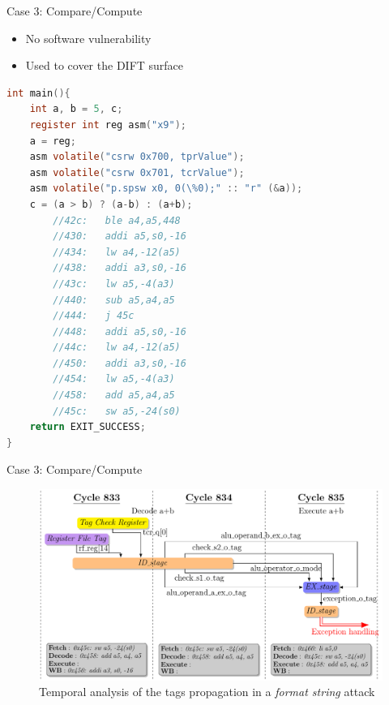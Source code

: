 \begin{frame}{Case 3: Compare/Compute}
    \begin{itemize}
        \justifying
        \item No software vulnerability
        \item Used to cover the DIFT surface
    \end{itemize}

    \centering
    \begin{minipage}[c]{\textwidth}
        \begin{lstlisting}[language=C,label=code:compareCompute]
int main(){
    int a, b = 5, c;
    register int reg asm("x9");
    a = reg;
    asm volatile("csrw 0x700, tprValue");
    asm volatile("csrw 0x701, tcrValue");
    asm volatile("p.spsw x0, 0(\%0);" :: "r" (&a));
    c = (a > b) ? (a-b) : (a+b);
        //42c:   ble a4,a5,448
        //430:   addi a5,s0,-16
        //434:   lw a4,-12(a5)
        //438:   addi a3,s0,-16
        //43c:   lw a5,-4(a3)
        //440:   sub a5,a4,a5
        //444:   j 45c
        //448:   addi a5,s0,-16
        //44c:   lw a4,-12(a5)
        //450:   addi a3,s0,-16
        //454:   lw a5,-4(a3)
        //458:   add a5,a4,a5
        //45c:   sw a5,-24(s0)
    return EXIT_SUCCESS;
}\end{lstlisting}
    \end{minipage}
\end{frame}

\begin{frame}[noframenumbering]{Case 3: Compare/Compute}
    \begin{figure}
        \centering
        \includegraphics[height=.8\textheight]{src/2_vuln_assessment/img/comp_compu/attaquePropag_v3_short.pdf}
        \caption{Temporal analysis of the tags propagation in a \textit{format string} attack}
        \label{fig:analyseTempoCompCompute}
    \end{figure}
\end{frame}

